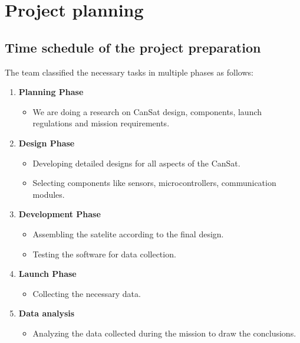 \documentclass[11pt]{article}
\begin{document}
\section{Project planning}

\subsection{Time schedule of the project preparation}
\hspace{0.5cm} The team classified the necessary tasks in multiple phases as follows:
\begin{enumerate}
\item \textbf{Planning Phase} 

\begin{itemize}
\item We are doing a research on CanSat design, components, launch regulations and mission requirements.
\end{itemize}

\item \textbf{Design Phase}

\begin{itemize}
\item Developing detailed designs for all aspects of the CanSat.
\item Selecting components like sensors, microcontrollers, communication modules.
\end{itemize}

\item \textbf{Development Phase}

\begin{itemize}
\item Assembling the satelite according to the final design.
\item Testing the software for data collection.
\end{itemize}

\item \textbf{Launch Phase}

\begin{itemize}
\item Collecting the necessary data.
\end{itemize}

\item \textbf{Data analysis}

\begin{itemize}
\item Analyzing the data collected during the mission to draw the conclusions.
\end{itemize}

\end{enumerate}
\end{document}
